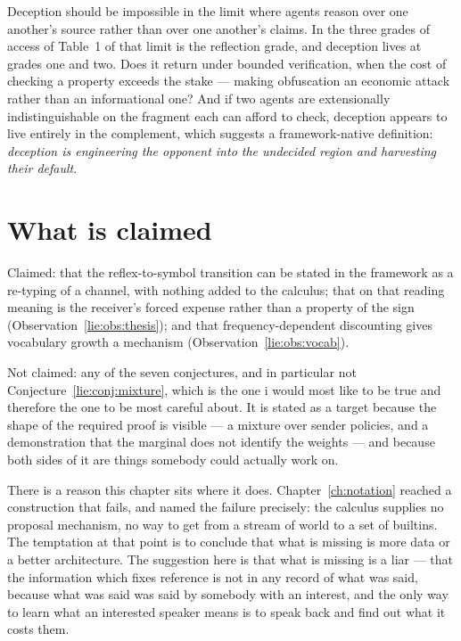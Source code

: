 \begin{question}
Deception should be impossible in the limit where agents reason over one
another's source rather than over one another's claims. In the three grades of
access of Table~1 of \chSci that limit is the reflection grade, and deception
lives at grades one and two. Does it return under bounded verification, when the
cost of checking a property exceeds the stake --- making obfuscation an economic
attack rather than an informational one? And if two agents are extensionally
indistinguishable on the fragment each can afford to check, deception appears to
live entirely in the complement, which suggests a framework-native definition:
\emph{deception is engineering the opponent into the undecided region and
harvesting their default}.
\end{question}

\section{What is claimed}
\label{sec:lie-claimed}

Claimed: that the reflex-to-symbol transition can be stated in the framework as a
re-typing of a channel, with nothing added to the calculus; that on that reading
meaning is the receiver's forced expense rather than a property of the sign
(Observation~\ref{lie:obs:thesis}); and that frequency-dependent discounting
gives vocabulary growth a mechanism (Observation~\ref{lie:obs:vocab}).

Not claimed: any of the seven conjectures, and in particular not
Conjecture~\ref{lie:conj:mixture}, which is the one i would most like to be
true and therefore the one to be most careful about. It is stated as a target
because the shape of the required proof is visible --- a mixture over sender
policies, and a demonstration that the marginal does not identify the weights ---
and because both sides of it are things somebody could actually work on.

There is a reason this chapter sits where it does. Chapter~\ref{ch:notation}
reached a construction that fails, and named the failure precisely: the calculus
supplies no proposal mechanism, no way to get from a stream of world to a set of
builtins. The temptation at that point is to conclude that what is missing is
more data or a better architecture. The suggestion here is that what is missing
is a liar --- that the information which fixes reference is not in any record of
what was said, because what was said was said by somebody with an interest, and
the only way to learn what an interested speaker means is to speak back and find
out what it costs them.

